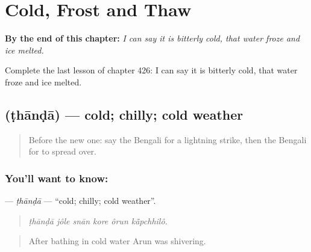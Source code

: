 
\chapter{Cold, Frost and Thaw}
\label{ch:bn-cold-frost-and-thaw}

\begin{chapteropening}
\textbf{By the end of this chapter:} \emph{I can say it is bitterly cold, that water froze and ice melted.}

Complete the last lesson of chapter 426: I can say it is bitterly cold, that water froze and ice melted.
\end{chapteropening}

\section[\texorpdfstring{\bn{ঠান্ডা} (ṭhānḍā)}{ঠান্ডা (ṭhānḍā)}]{ (ṭhānḍā) — cold; chilly; cold weather}

\label{lesson:BN-C426-thanda}



\begin{quote}
Before the new one: say the Bengali for a lightning strike, then the Bengali for to spread over.
\end{quote}

\subsection*{You'll want to know: }
\textbf{} — \emph{ṭhānḍā} — \textquotedblleft{}cold; chilly; cold weather\textquotedblright{}.

\begin{quote}
     
\end{quote}

\begin{quote}
\emph{ṭhānḍā jôle snān kore ôrun kā̃pchhilô.}
\end{quote}

\begin{quote}
After bathing in cold water Arun was shivering.
\end{quote}

